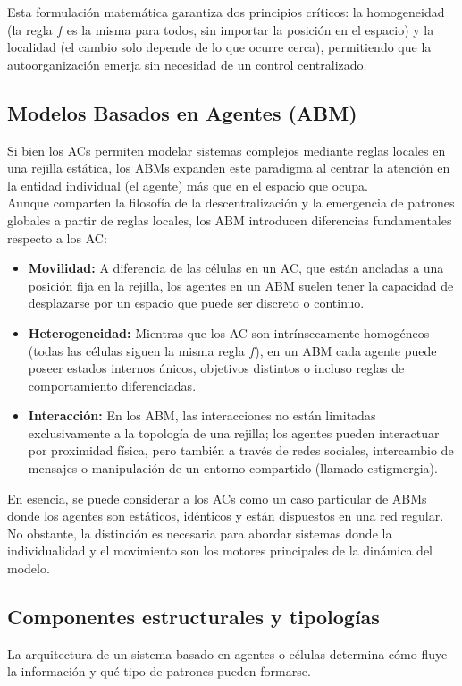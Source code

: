 \documentclass[runningheads]{llncs}
\begin{document}
Esta formulación matemática garantiza dos principios críticos: la homogeneidad (la regla $f$ es la misma para todos, sin importar la posición en el espacio) y la localidad (el cambio solo depende de lo que ocurre cerca), permitiendo que la autoorganización emerja sin necesidad de un control centralizado.

\subsection{Modelos Basados en Agentes (ABM)}
Si bien los ACs permiten modelar sistemas complejos mediante reglas locales en una rejilla estática, los ABMs expanden este paradigma al centrar la atención en la entidad individual (el agente) más que en el espacio que ocupa.\\

Aunque comparten la filosofía de la descentralización y la emergencia de patrones globales a partir de reglas locales, los ABM introducen diferencias fundamentales respecto a los AC:
\begin{itemize}
    \item \textbf{Movilidad:} A diferencia de las células en un AC, que están ancladas a una posición fija en la rejilla, los agentes en un ABM suelen tener la capacidad de desplazarse por un espacio que puede ser discreto o continuo.
    \item \textbf{Heterogeneidad:} Mientras que los AC son intrínsecamente homogéneos (todas las células siguen la misma regla $f$), en un ABM cada agente puede poseer estados internos únicos, objetivos distintos o incluso reglas de comportamiento diferenciadas.
    \item \textbf{Interacción:} En los ABM, las interacciones no están limitadas exclusivamente a la topología de una rejilla; los agentes pueden interactuar por proximidad física, pero también a través de redes sociales, intercambio de mensajes o manipulación de un entorno compartido (llamado estigmergia).
\end{itemize}
En esencia, se puede considerar a los ACs como un caso particular de ABMs donde los agentes son estáticos, idénticos y están dispuestos en una red regular. No obstante, la distinción es necesaria para abordar sistemas donde la individualidad y el movimiento son los motores principales de la dinámica del modelo.

\subsection{Componentes estructurales y tipologías}
La arquitectura de un sistema basado en agentes o células determina cómo fluye la información y qué tipo de patrones pueden formarse.
\end{document}
